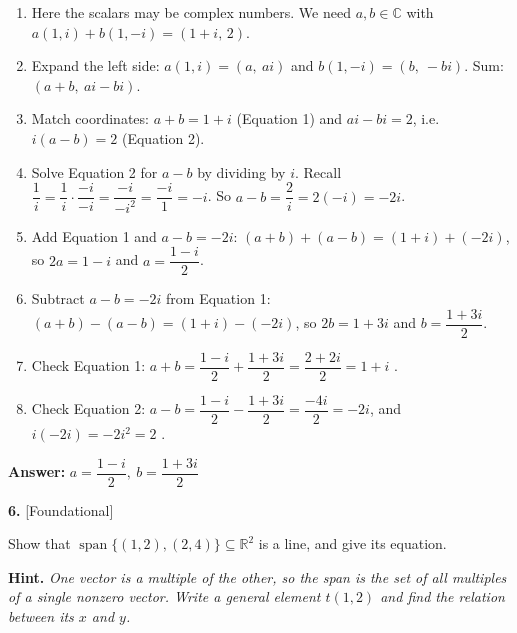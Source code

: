 \documentclass[11pt]{article}
\begin{document}
\begin{tcolorbox}[breakable,colback=ans,colframe=ansb,boxrule=0.5pt,left=4pt,right=4pt,top=2pt,bottom=2pt]\begin{enumerate}[leftmargin=2.2em,itemsep=1pt,topsep=1pt,label=\textbf{Step \arabic*.}]\item Here the scalars may be complex numbers. We need $a,b\in\mathbb{C}$ with $a(1,i)+b(1,-i)=(1+i,\,2)$.
\item Expand the left side: $a(1,i)=(a,\ ai)$ and $b(1,-i)=(b,\ -bi)$. Sum: $(a+b,\ ai-bi)$.
\item Match coordinates: $a+b=1+i$ \quad (Equation 1) and \quad $ai-bi=2$, i.e.\ $i(a-b)=2$ \quad (Equation 2).
\item Solve Equation 2 for $a-b$ by dividing by $i$. Recall $\dfrac1i=\dfrac{1}{i}\cdot\dfrac{-i}{-i}=\dfrac{-i}{-i^{2}}=\dfrac{-i}{1}=-i$. So $a-b=\dfrac2i=2(-i)=-2i$.
\item Add Equation 1 and $a-b=-2i$: $(a+b)+(a-b)=(1+i)+(-2i)$, so $2a=1-i$ and $a=\dfrac{1-i}{2}$.
\item Subtract $a-b=-2i$ from Equation 1: $(a+b)-(a-b)=(1+i)-(-2i)$, so $2b=1+3i$ and $b=\dfrac{1+3i}{2}$.
\item Check Equation 1: $a+b=\dfrac{1-i}{2}+\dfrac{1+3i}{2}=\dfrac{2+2i}{2}=1+i$ \checkmark.
\item Check Equation 2: $a-b=\dfrac{1-i}{2}-\dfrac{1+3i}{2}=\dfrac{-4i}{2}=-2i$, and $i(-2i)=-2i^{2}=2$ \checkmark.
\end{enumerate}\textbf{Answer:} $a=\dfrac{1-i}{2},\ b=\dfrac{1+3i}{2}$\end{tcolorbox}
\par\vspace{2pt}
\begin{minipage}{\linewidth}\textbf{6.} \hfill{\scriptsize\color{ink}[Foundational]}\par\nopagebreak Show that $\operatorname{span}\{(1,2),(2,4)\}\subseteq\mathbb{R}^{2}$ is a line, and give its equation.
\par\smallskip\begingroup\small\color{ink}\textbf{Hint.} \textit{One vector is a multiple of the other, so the span is the set of all multiples of a single nonzero vector. Write a general element $t(1,2)$ and find the relation between its $x$ and $y$.}\endgroup
\end{minipage}\par\nopagebreak
\end{document}
